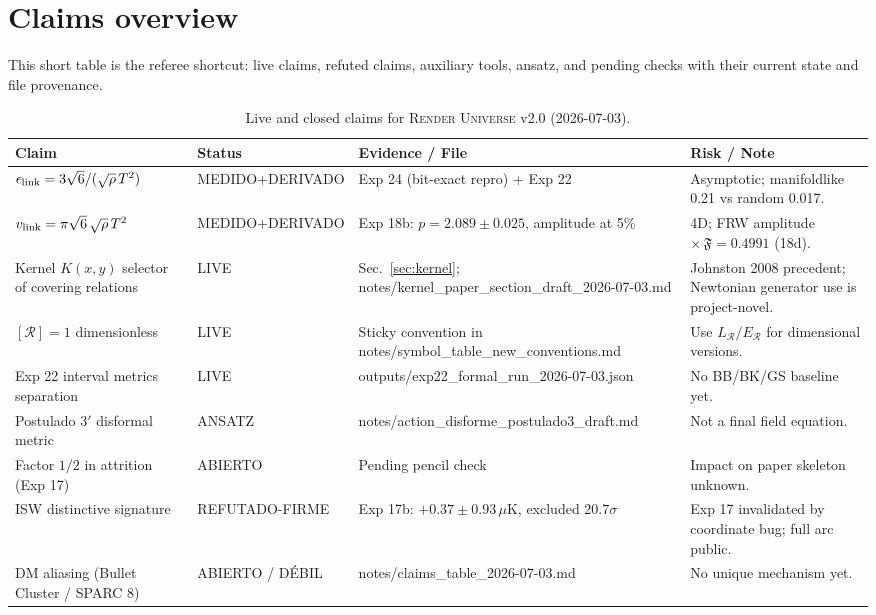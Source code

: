 \documentclass[12pt]{article}
\begin{document}
\section*{Claims overview}
\label{app:claims}
This short table is the referee shortcut: live claims, refuted claims, auxiliary tools, ansatz, and pending checks with their current state and file provenance.

\begin{table}[ht]
\centering
\caption{Live and closed claims for \textsc{Render Universe} v2.0 (2026-07-03).}
\label{tab:claims}
\begin{tabular}{llll}
\hline
\textbf{Claim} & \textbf{Status} & \textbf{Evidence / File} & \textbf{Risk / Note} \\
\hline
$\epsilon_{\rm link}=3\sqrt{6}/(\sqrt{\rho}\,T^2)$ & MEDIDO+DERIVADO & Exp 24 (bit-exact repro) + Exp 22 & Asymptotic; manifoldlike 0.21 vs random 0.017. \\
$v_{\rm link}=\pi\sqrt{6}\,\sqrt{\rho}\,T^2$ & MEDIDO+DERIVADO & Exp 18b: $p=2.089\pm0.025$, amplitude at 5\% & 4D; FRW amplitude $\times\,\mathfrak{F}=0.4991$ (18d). \\
Kernel $K(x,y)$ selector of covering relations & LIVE & Sec.~\ref{sec:kernel}; notes/kernel\_paper\_section\_draft\_2026-07-03.md & Johnston 2008 precedent; Newtonian generator use is project-novel. \\
$[\mathcal R]=1$ dimensionless & LIVE & Sticky convention in notes/symbol\_table\_new\_conventions.md & Use $L_{\mathcal R}/E_{\mathcal R}$ for dimensional versions. \\
Exp 22 interval metrics separation & LIVE & outputs/exp22\_formal\_run\_2026-07-03.json & No BB/BK/GS baseline yet. \\
\hline
Postulado 3$'$ disformal metric & ANSATZ & notes/action\_disforme\_postulado3\_draft.md & Not a final field equation. \\
Factor $1/2$ in attrition (Exp 17) & ABIERTO & Pending pencil check & Impact on paper skeleton unknown. \\
\hline
ISW distinctive signature & REFUTADO-FIRME & Exp 17b: $+0.37\pm0.93\,\mu$K, excluded $20.7\sigma$ & Exp 17 invalidated by coordinate bug; full arc public. \\
\hline
DM aliasing (Bullet Cluster / SPARC 8) & ABIERTO / DÉBIL & notes/claims\_table\_2026-07-03.md & No unique mechanism yet. \\
\hline
\end{tabular}
\end{table}
\end{document}
